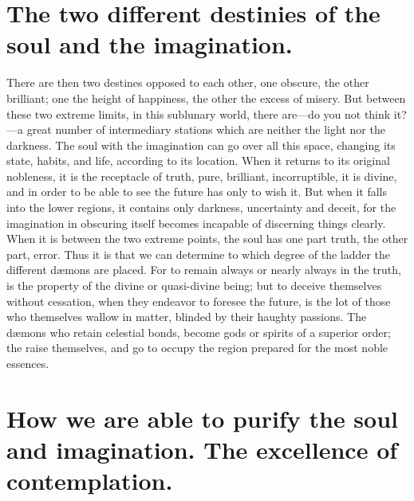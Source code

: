 \documentclass[12pt]{article}
\begin{document}
\section{The two different destinies of the soul and the imagination.}

There are then two destines opposed to each other, one obscure, the other
brilliant; one the height of happiness, the other the excess of misery. But
between these two extreme limits, in this sublunary world, there are---do you
not think it?---a great number of intermediary stations which are neither the
light nor the darkness. The soul with the imagination can go over all this
space, changing its state, habits, and life, according to its location. When it
returns to its original nobleness, it is the receptacle of truth, pure,
brilliant, incorruptible, it is divine, and in order to be able to see the
future has only to wish it. But when it falls into the lower regions, it
contains only darkness, uncertainty and deceit, for the imagination in
obscuring itself becomes incapable of discerning things clearly. When it is
between the two extreme points, the soul has one part truth, the other part,
error. Thus it is that we can determine to which degree of the ladder the
different d{\ae}mons are placed. For to remain always or nearly always in the
truth, is the property of the divine or quasi-divine being; but to deceive
themselves without cessation, when they endeavor to foresee the future, is the
lot of those who themselves wallow in matter, blinded by their haughty
passions. The d{\ae}mons who retain celestial bonds, become gods or spirits of
a superior order; the raise themselves, and go to occupy the region prepared
for the most noble essences.


\section{How we are able to purify the soul and imagination. The excellence of
contemplation.}
\end{document}
